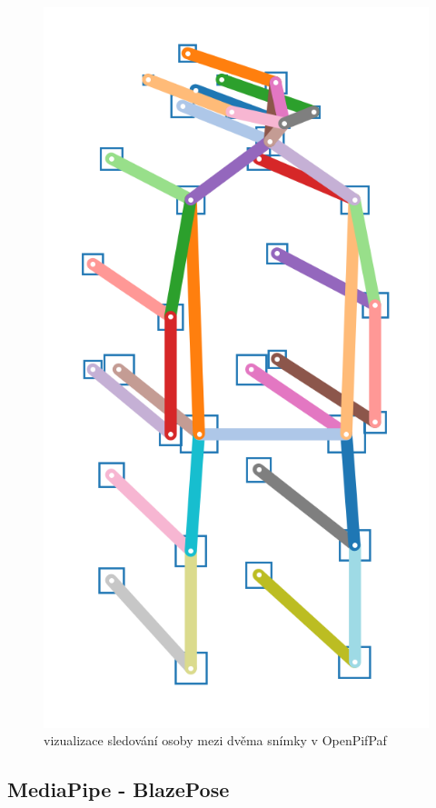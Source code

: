 \begin{figure}[]
    \centering
    \centering
    \includegraphics[height=0.2\textheight]{Figures/skeleton_forward2.png}
    \caption{vizualizace  sledování osoby mezi dvěma snímky v OpenPifPaf \cite{openpifpaf}}
    \label{fig:pipaf-tracking}
\end{figure}

\subsection{MediaPipe - BlazePose}

